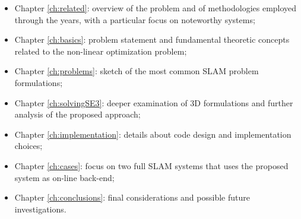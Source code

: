 \begin{itemize}
    \item Chapter \ref{ch:related}: overview of the problem and of methodologies employed through the years, with a particular focus on noteworthy systems;
    \item Chapter \ref{ch:basics}: problem statement and fundamental theoretic concepts related to the non-linear optimization problem;
    \item Chapter \ref{ch:problems}: sketch of the most common SLAM problem formulations;
    \item Chapter \ref{ch:solvingSE3}: deeper examination of 3D formulations and further analysis of the proposed approach;
    \item Chapter \ref{ch:implementation}: details about code design and implementation choices;
    \item Chapter \ref{ch:cases}: focus on two full SLAM systems that uses the proposed system as on-line back-end;
    \item Chapter \ref{ch:conclusions}: final considerations and possible future investigations. 
\end{itemize}